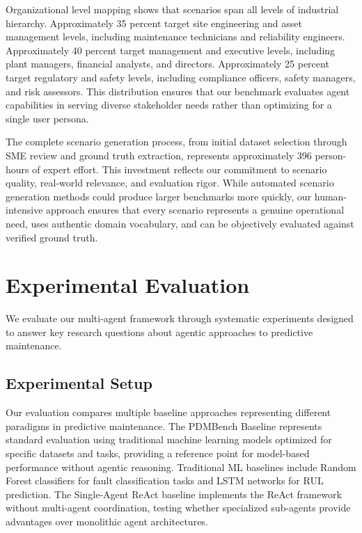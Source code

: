 \documentclass[conference]{IEEEtran}
\begin{document}
Organizational level mapping shows that scenarios span all levels of industrial hierarchy. Approximately 35 percent target site engineering and asset management levels, including maintenance technicians and reliability engineers. Approximately 40 percent target management and executive levels, including plant managers, financial analysts, and directors. Approximately 25 percent target regulatory and safety levels, including compliance officers, safety managers, and risk assessors. This distribution ensures that our benchmark evaluates agent capabilities in serving diverse stakeholder needs rather than optimizing for a single user persona.

The complete scenario generation process, from initial dataset selection through SME review and ground truth extraction, represents approximately 396 person-hours of expert effort. This investment reflects our commitment to scenario quality, real-world relevance, and evaluation rigor. While automated scenario generation methods could produce larger benchmarks more quickly, our human-intensive approach ensures that every scenario represents a genuine operational need, uses authentic domain vocabulary, and can be objectively evaluated against verified ground truth.

\section{Experimental Evaluation}

We evaluate our multi-agent framework through systematic experiments designed to answer key research questions about agentic approaches to predictive maintenance.

\subsection{Experimental Setup}

Our evaluation compares multiple baseline approaches representing different paradigms in predictive maintenance. The PDMBench Baseline represents standard evaluation using traditional machine learning models optimized for specific datasets and tasks, providing a reference point for model-based performance without agentic reasoning. Traditional ML baselines include Random Forest classifiers for fault classification tasks and LSTM networks for RUL prediction. The Single-Agent ReAct baseline implements the ReAct framework without multi-agent coordination, testing whether specialized sub-agents provide advantages over monolithic agent architectures.
\end{document}
